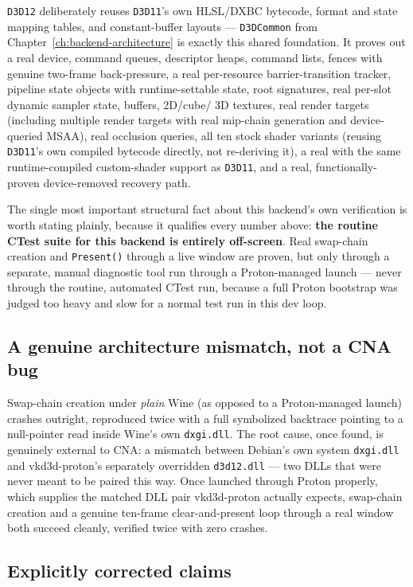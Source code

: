 \texttt{D3D12} deliberately reuses \texttt{D3D11}'s own HLSL/DXBC bytecode, format and state
mapping tables, and constant-buffer layouts --- \texttt{D3DCommon} from
Chapter~\ref{ch:backend-architecture} is exactly this shared foundation. It proves out a real
device, command queues, descriptor heaps, command lists, fences with genuine two-frame
back-pressure, a real per-resource barrier-transition tracker, pipeline state objects with
runtime-settable state, root signatures, real per-slot dynamic sampler state, buffers, 2D/cube/%
3D textures, real render targets (including multiple render targets with real mip-chain
generation and device-queried MSAA), real occlusion queries, all ten stock shader variants
(reusing \texttt{D3D11}'s own compiled bytecode directly, not re-deriving it), a real
 with the same runtime-compiled custom-shader support as
\texttt{D3D11}, and a real, functionally-proven device-removed recovery path.

The single most important structural fact about this backend's own verification is worth
stating plainly, because it qualifies every number above: \textbf{the routine CTest suite for
this backend is entirely off-screen}. Real swap-chain creation and \texttt{Present()} through
a live window are proven, but only through a separate, manual diagnostic tool run through a
Proton-managed launch --- never through the routine, automated CTest run, because a full
Proton bootstrap was judged too heavy and slow for a normal test run in this dev loop.

\subsection{A genuine architecture mismatch, not a CNA bug}

Swap-chain creation under \emph{plain} Wine (as opposed to a Proton-managed launch) crashes
outright, reproduced twice with a full symbolized backtrace pointing to a null-pointer read
inside Wine's own \texttt{dxgi.dll}. The root cause, once found, is genuinely external to
CNA: a mismatch between Debian's own system \texttt{dxgi.dll} and vkd3d-proton's separately
overridden \texttt{d3d12.dll} --- two DLLs that were never meant to be paired this way. Once
launched through Proton properly, which supplies the matched DLL pair vkd3d-proton actually
expects, swap-chain creation and a genuine ten-frame clear-and-present loop through a real
window both succeed cleanly, verified twice with zero crashes.

\subsection{Explicitly corrected claims}

